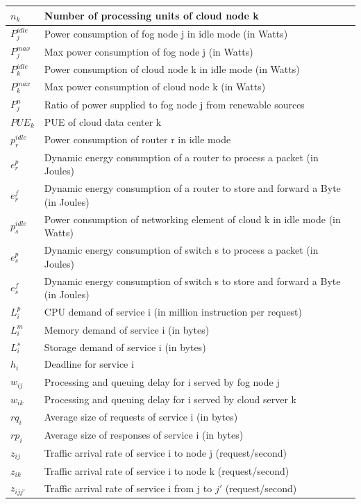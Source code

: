 \documentclass[twocolumn]{article}
\begin{document}
\begin{supertabular}{|p{1.3cm}p{5.8cm}|}
    $n_{k}$&Number of processing units of cloud node k\\
\hline    
    $P_{j}^{idle}$&Power consumption of fog node j in idle mode
(in Watts)\\
	$P_{j}^{max}$&Max power consumption of fog node j (in Watts)\\
    $P_{k}^{idle}$&Power consumption of cloud node k in idle mode
(in Watts)\\
	$P_{k}^{max}$&Max power consumption of cloud node k (in Watts)\\
	$P^{n}_{j}$&Ratio of power supplied to fog node j from renewable sources\\
	$PUE_{k}$&PUE of cloud data center k\\
	$p_{r}^{idle}$&Power consumption of router r in idle mode\\
    $e_{r}^{p}$&Dynamic energy consumption of a router to process a packet (in Joules)\\
    $e_{r}^{f}$&Dynamic energy consumption of a router to store and forward a Byte (in Joules)\\
    $p_{s}^{idle}$&Power consumption of networking element of cloud k in idle mode (in Watts)\\
    $e_{s}^{p}$&Dynamic energy consumption of switch s to process a packet (in Joules)\\
    $e^{f}_{s}$&Dynamic energy consumption of switch s to store and forward a Byte (in Joules)\\    
\hline
    $L_{i}^{p}$&CPU demand of service i (in million instruction per request)\\
    $L_{i}^{m}$&Memory demand of service i (in bytes)\\
    $L_{i}^{s}$&Storage demand of service i (in bytes)\\
    $h_{i}$&Deadline for service i\\
	$w_{ij}$&Processing and queuing delay for i served by fog node j\\
	$w_{ik}$&Processing and queuing delay for i served by cloud server k\\
\hline
	$rq_{i}$&Average size of requests of service i (in bytes)\\
    $rp_{i}$&Average size of responses of service i (in bytes)\\
    $z_{ij}$&Traffic arrival rate of service i to node j (request/second)\\
    $z_{ik}$&Traffic arrival rate of service i to node k (request/second)\\
	$z_{ijj'}$&Traffic arrival rate of service i from j to $j'$ (request/second)\\

\end{supertabular}
\end{document}
